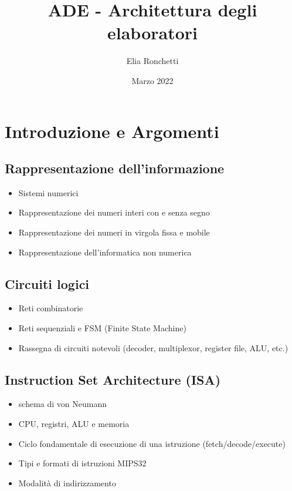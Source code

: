 \documentclass[12pt, a4paper, openany]{book}
\begin{document}
\title{ADE - Architettura degli elaboratori}
\author{Elia Ronchetti}
\date{Marzo 2022}

\maketitle
\tableofcontents

\chapter{Introduzione e Argomenti}
\section{Rappresentazione dell'informazione}
\begin{itemize}
    \item Sistemi numerici
    \item Rappresentazione dei numeri interi con e senza segno
    \item Rappresentazione dei numeri in virgola fissa e mobile
    \item Rappresentazione dell'informatica non numerica
\end{itemize}

\section{Circuiti logici}
\begin{itemize}
    \item Reti combinatorie
    \item Reti sequenziali e FSM (Finite State Machine)
    \item Rassegna di circuiti notevoli (decoder, multiplexor, register file, ALU, etc.)
\end{itemize}

\section{Instruction Set Architecture (ISA)}
\begin{itemize}
    \item schema di von Neumann
    \item CPU, registri, ALU e memoria
    \item Ciclo fondamentale di esecuzione di una istruzione (fetch/decode/execute)
    \item Tipi e formati di istruzioni MIPS32
    \item Modalità di indirizzamento
\end{itemize}
\end{document}
